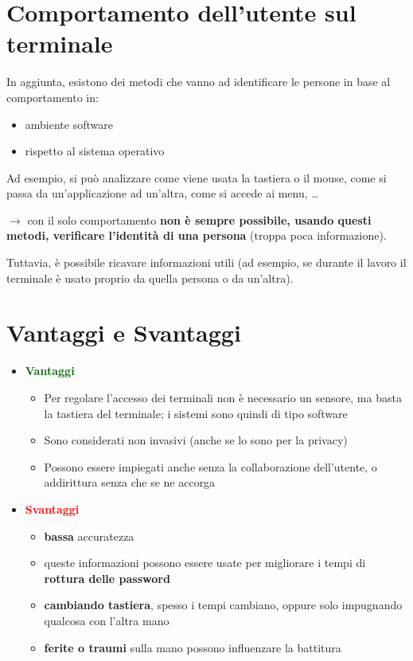\documentclass{report}
\begin{document}
\section{Comportamento dell'utente sul terminale}
In aggiunta, esistono dei metodi che vanno ad identificare
le persone in base al comportamento in:
\begin{itemize}
    \item ambiente software 
    \item rispetto al sistema operativo
\end{itemize}


\noindent Ad esempio, si può analizzare come viene usata la tastiera o il mouse,
come si passa da un'applicazione ad un'altra, come si accede ai menu, \dots

$\rightarrow$ con il solo comportamento \textbf{non è sempre possibile, usando questi metodi,
verificare l'identità di una persona} (troppa poca informazione).

\noindent Tuttavia, è possibile ricavare informazioni utili (ad esempio,
se durante il lavoro il terminale è usato proprio da quella persona o da un'altra).


\section{Vantaggi e Svantaggi}
\begin{itemize}
    \item \textcolor{darkgreen}{\textbf{Vantaggi}}
    \begin{itemize}
        \item Per regolare l'accesso dei terminali non è necessario un sensore, ma basta la tastiera del terminale; i sistemi sono quindi di tipo software
        \item Sono considerati non invasivi (anche se lo sono per la privacy)
        \item Possono essere impiegati anche senza la collaborazione dell'utente, o 
        addirittura senza che se ne accorga
    \end{itemize}
    \item \textcolor{red}{\textbf{Svantaggi}}
    \begin{itemize}
        \item \textbf{bassa} accuratezza
        \item queste informazioni possono essere usate per migliorare i tempi di \textbf{rottura delle password}
        \item \textbf{cambiando tastiera}, spesso i tempi cambiano, oppure solo impugnando qualcosa con l'altra mano
        \item \textbf{ferite o traumi} sulla mano possono influenzare la battitura
    \end{itemize}
\end{itemize}
\end{document}
